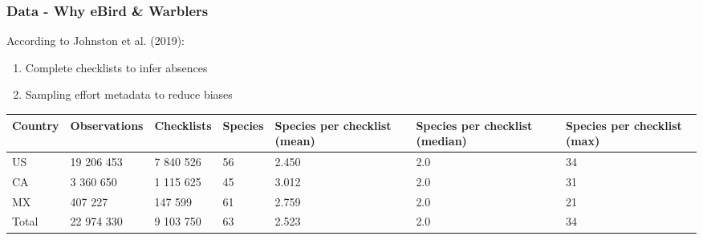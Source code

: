 \documentclass[10pt]{beamer}
\renewcommand{\arraystretch}{1.25}
\begin{document}
\begin{frame}
  \frametitle{Data - Why eBird \& Warblers}
  According to Johnston et al. (2019):
  \begin{enumerate}
    \item Complete checklists to infer absences
    \item Sampling effort metadata to reduce biases
  \end{enumerate}
  \begin{adjustbox}{center, caption={Structure of the Warblers (\textit{Parulidae}) occurrence data for North America in the eBird complete checklists}, float=table}
    \begin{table}
      \scriptsize
      \def\arraystretch{1.5}
      \hspace{}\begin{tabularx}{1.1\textwidth}{X X X X X X X}
      \hline
      Country & Observations & Checklists & Species & Species per checklist (mean) & Species per checklist (median) & Species per checklist (max) \\
      \hline
      US    & 19 206 453 & 7 840 526 & 56 & 2.450 & 2.0 & 34 \\
      CA    & 3 360 650  & 1 115 625 & 45 & 3.012 & 2.0 & 31 \\
      MX    & 407 227    & 147 599   & 61 & 2.759 & 2.0 & 21 \\
      Total & 22 974 330 & 9 103 750 & 63 & 2.523 & 2.0 & 34 \\
      \hline
    \end{tabularx}
  \end{table}
 \end{adjustbox}
\end{frame}
\end{document}
